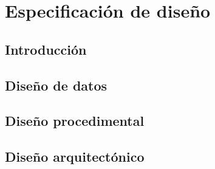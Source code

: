 \chapter{Especificación de diseño}
\label{cha:Especificación de diseño}

\section{Introducción}

\section{Diseño de datos}

\section{Diseño procedimental}

\section{Diseño arquitectónico}

